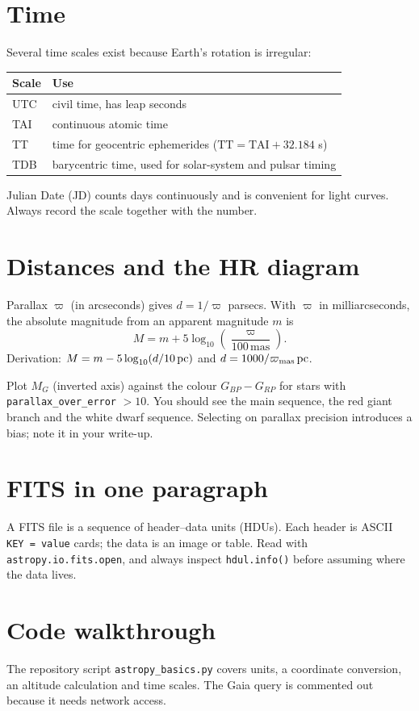 \section{Time}
Several time scales exist because Earth's rotation is irregular:
\begin{center}
\begin{tabular}{@{}ll@{}}
\toprule
Scale & Use \\ \midrule
UTC & civil time, has leap seconds \\
TAI & continuous atomic time \\
TT & time for geocentric ephemerides ($\mathrm{TT}=\mathrm{TAI}+32.184$ s) \\
TDB & barycentric time, used for solar-system and pulsar timing \\
\bottomrule
\end{tabular}
\end{center}
Julian Date (JD) counts days continuously and is convenient for light curves. Always record the scale together with the number.

\section{Distances and the HR diagram}
Parallax $\varpi$ (in arcseconds) gives $d = 1/\varpi$ parsecs. With $\varpi$ in milliarcseconds, the absolute magnitude from an apparent magnitude $m$ is
\[
M = m + 5\log_{10}\!\left(\frac{\varpi}{100\,\mathrm{mas}}\right).
\]
Derivation: $M = m - 5\log_{10}(d/10\,\mathrm{pc})$ and $d = 1000/\varpi_{\mathrm{mas}}\,\mathrm{pc}$.

Plot $M_G$ (inverted axis) against the colour $G_{BP}-G_{RP}$ for stars with \texttt{parallax\_over\_error} $> 10$. You should see the main sequence, the red giant branch and the white dwarf sequence. Selecting on parallax precision introduces a bias; note it in your write-up.

\section{FITS in one paragraph}
A FITS file is a sequence of header--data units (HDUs). Each header is ASCII \texttt{KEY = value} cards; the data is an image or table. Read with \texttt{astropy.io.fits.open}, and always inspect \texttt{hdul.info()} before assuming where the data lives.

\section{Code walkthrough}
The repository script \texttt{astropy\_basics.py} covers units, a coordinate conversion, an altitude calculation and time scales. The Gaia query is commented out because it needs network access.


